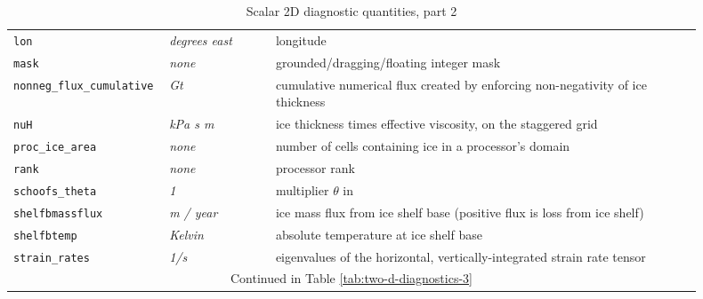 \begin{table}[ht]
\begin{tabular}{p{0.15\linewidth}p{0.15\linewidth}p{0.6\linewidth}}
    \texttt{lon} & \textsl{degrees east} & longitude \\
    \texttt{mask} & \textsl{none} & grounded/dragging/floating integer mask \\
    \texttt{nonneg_flux_cumulative} & \textsl{Gt} & cumulative numerical flux created by enforcing non-negativity of ice thickness \\
    \texttt{nuH} & \textsl{kPa s m} & ice thickness times effective viscosity, on the staggered grid\\
    \texttt{proc_ice_area} & \textsl{none} &  number of cells containing ice in a processor's domain \\
    \texttt{rank} & \textsl{none} &  processor rank \\
    \texttt{schoofs_theta} & \textsl{1} &  multiplier $\theta$ in \cite{Schoofbasaltopg2003} \\
    \texttt{shelfbmassflux} & \textsl{m / year} & ice mass flux from ice shelf base (positive flux is loss from ice shelf) \\
    \texttt{shelfbtemp} & \textsl{Kelvin} & absolute temperature at ice shelf base \\
    \texttt{strain_rates} & \textsl{1/s} & eigenvalues of the horizontal, vertically-integrated strain rate tensor \\
   \multicolumn{3}{c}{Continued in Table \ref{tab:two-d-diagnostics-3}}\\
  \bottomrule
  \end{tabular}
  \caption{Scalar 2D diagnostic quantities, part 2}
  \label{tab:two-d-diagnostics-2}
\end{table}

